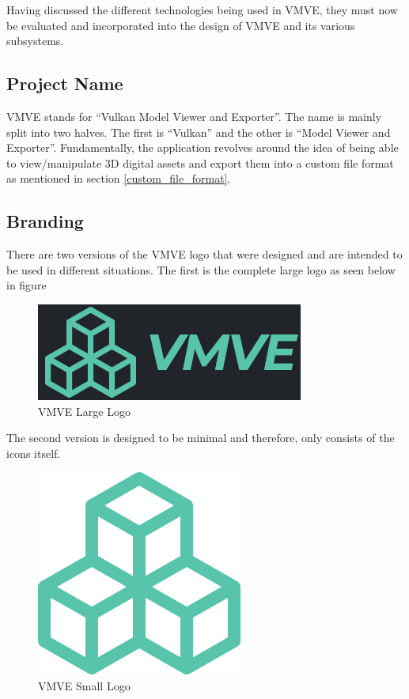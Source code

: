 \documentclass[11pt]{article}
\begin{document}
Having discussed the different technologies being used in VMVE, they must now be
evaluated and incorporated into the design of VMVE and its various subsystems.

\subsection{Project Name}
VMVE stands for ``Vulkan Model Viewer and Exporter''. The name is mainly split
into two halves. The first is ``Vulkan'' and the other is ``Model Viewer and
Exporter''. Fundamentally, the application revolves around the idea of being able
to view/manipulate 3D digital assets and export them into a custom file format
as mentioned in section \ref{custom_file_format}.

\subsection{Branding}

There are two versions of the VMVE logo that were designed and are intended to
be used in different situations. The first is the complete large logo as seen
below in figure {}

\begin{figure}[h!]
  \centering
  \includegraphics{images/project_logo.png}
  \caption{VMVE Large Logo}
  \label{fig:project_logo_large}
\end{figure}

The second version is designed to be minimal and therefore, only consists of the
icons itself.

\begin{figure}[h!]
  \centering
  \includegraphics{images/project_icon.png}
  \caption{VMVE Small Logo}
  \label{fig:project_logo_small}
\end{figure}
\end{document}

